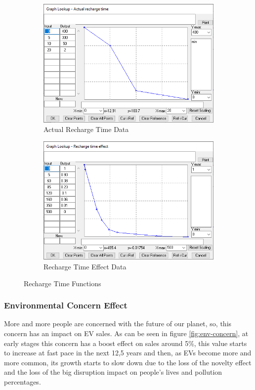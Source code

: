 \begin{figure}[htbp]
\centering
\begin{subfigure}{0.5\textwidth}
  \centering
  \includegraphics[width=0.89\linewidth]{img/recharge-time.png}
  \caption{Actual Recharge Time Data}
  \label{fig:recharge-time}
\end{subfigure}%
\begin{subfigure}{0.5\textwidth}
  \centering
  \includegraphics[width=0.89\linewidth]{img/recharge-time-effect.png}
  \caption{Recharge Time Effect Data}
  \label{fig:recharge-time-effect}
\end{subfigure}
\caption{Recharge Time Functions}
\label{fig:recharge-time-funcs}
\end{figure}

\subsubsection{Environmental Concern Effect}
More and more people are concerned with the future of our planet, so, this concern has an impact on EV sales. As can be seen in figure \ref{fig:env-concern}, at early stages this concern has a boost effect on sales around 5\%, this value starts to increase at fast pace in the next 12,5 years and then, as EVs become more and more common, its growth starts to slow down due to the loss of the novelty effect and the loss of the big disruption impact on people's lives and pollution percentages.

